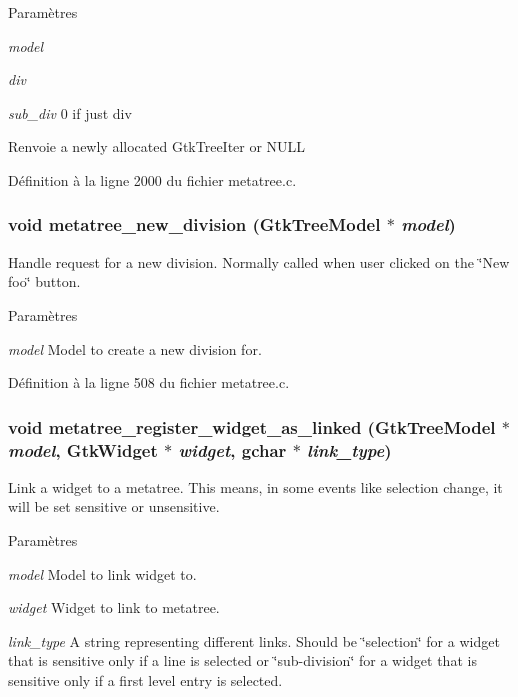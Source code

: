 \begin{DoxyParams}{Paramètres}
\item[{\em model}]\item[{\em div}]\item[{\em sub\_\-div}]0 if just div\end{DoxyParams}
\begin{DoxyReturn}{Renvoie}
a newly allocated GtkTreeIter or NULL 
\end{DoxyReturn}


Définition à la ligne 2000 du fichier metatree.c.

\subsubsection[{metatree\_\-new\_\-division}]{\setlength{\rightskip}{0pt plus 5cm}void metatree\_\-new\_\-division (GtkTreeModel $\ast$ {\em model})}\label{metatree_8c_a9d3ab11aa08343d4770b2baec4ae159b}
Handle request for a new division. Normally called when user clicked on the \char`\"{}New foo\char`\"{} button.


\begin{DoxyParams}{Paramètres}
\item[{\em model}]Model to create a new division for. \end{DoxyParams}


Définition à la ligne 508 du fichier metatree.c.

\subsubsection[{metatree\_\-register\_\-widget\_\-as\_\-linked}]{\setlength{\rightskip}{0pt plus 5cm}void metatree\_\-register\_\-widget\_\-as\_\-linked (GtkTreeModel $\ast$ {\em model}, \/  GtkWidget $\ast$ {\em widget}, \/  gchar $\ast$ {\em link\_\-type})}\label{metatree_8c_a84b23abc85668cd5270c2a36e2670668}
Link a widget to a metatree. This means, in some events like selection change, it will be set sensitive or unsensitive.


\begin{DoxyParams}{Paramètres}
\item[{\em model}]Model to link widget to. \item[{\em widget}]Widget to link to metatree. \item[{\em link\_\-type}]A string representing different links. Should be \char`\"{}selection\char`\"{} for a widget that is sensitive only if a line is selected or \char`\"{}sub-\/division\char`\"{} for a widget that is sensitive only if a first level entry is selected. \end{DoxyParams}


